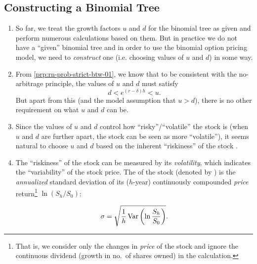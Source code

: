 \subsection{Constructing a Binomial Tree}
\begin{enumerate}
\item So far, we treat the growth factors \(u\) and \(d\) for the binomial tree
as given and perform numerous calculations based on them. But in practice we do
not have a ``given'' binomial tree and in order to use the binomial option
pricing model, we need to \emph{construct} one (i.e. choosing values of \(u\)
and \(d\)) in some way.

\item \label{it:tree-ud-bounds}
From \cref{prp:rn-prob-strict-btw-01}, we know that to be consistent with
the no-arbitrage principle, the values of \(u\) and \(d\) must satisfy
\[
d<e^{(r-\delta)h}<u.
\]
But apart from this (and the model assumption that \(u>d\)), there is no other
requirement on what \(u\) and \(d\) can be.

\item Since the values of \(u\) and \(d\) control how ``risky''/``volatile'' the stock
 is (when \(u\) and \(d\) are further apart, the stock
 can be seen as more ``volatile''), it seems natural to
choose \(u\) and \(d\) based on the inherent ``riskiness'' of the stock
.

\item \label{it:volatility}
The ``riskiness'' of the stock  can be measured by its
\emph{volatility}, which indicates the ``variability'' of the stock price. The
 of the stock  (denoted by
) is the \emph{annualized} standard deviation of its
(\(h\)-year) continuously compounded \emph{price} return\footnote{That is, we
consider only the changes in \emph{price} of the stock and ignore the
continuous dividend (growth in no.\ of shares owned) in the calculation.} \(\ln
(S_h/S_0)\):

\[
\sigma=\sqrt{\frac{1}{h}\operatorname{Var}\qty(\ln\frac{S_h}{S_0})}.
\]


\end{enumerate}
